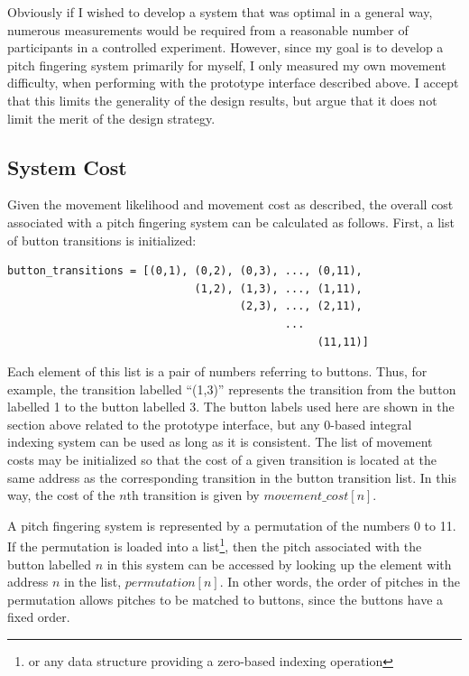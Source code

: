 \documentclass[sigconf]{nimeart}
\begin{document}
Obviously if I wished to develop a system that was optimal in a general way, numerous measurements would be required from a reasonable number of participants in a controlled experiment. However, since my goal is to develop a pitch fingering system primarily for myself, I only measured my own movement difficulty, when performing with the prototype interface described above. I accept that this limits the generality of the design results, but argue that it does not limit the merit of the design strategy.

\subsection{System Cost}\label{system-cost}

Given the movement likelihood and movement cost as described, the overall cost associated with a pitch fingering system can be calculated as follows. First, a list of button transitions is initialized:

\begin{Verbatim}[breaklines=true,breakanywhere=true,fontsize=\footnotesize]
button_transitions = [(0,1), (0,2), (0,3), ..., (0,11),
                             (1,2), (1,3), ..., (1,11),
                                    (2,3), ..., (2,11),
                                           ...
                                                (11,11)]
\end{Verbatim}

Each element of this list is a pair of numbers referring to buttons. Thus, for example, the transition labelled ``(1,3)'' represents the transition from the button labelled 1 to the button labelled 3. The button labels used here are shown in the section above related to the prototype interface, but any 0-based integral indexing system can be used as long as it is consistent. The list of movement costs may be initialized so that the cost of a given transition is located at the same address as the corresponding transition in the button transition list. In this way, the cost of the $n$th transition is given by $movement\_cost[n]$.

A pitch fingering system is represented by a permutation of the numbers 0 to 11. If the permutation is loaded into a list\footnote{or any data structure providing a zero-based indexing operation}, then the pitch associated with the button labelled $n$ in this system can be accessed by looking up the element with address $n$ in the list, $permutation[n]$. In other words, the order of pitches in the permutation allows pitches to be matched to buttons, since the buttons have a fixed order.
\end{document}
